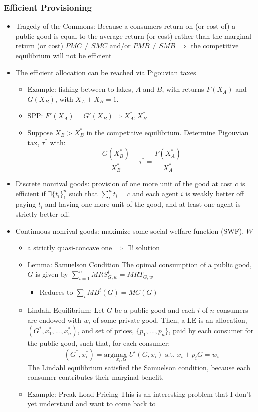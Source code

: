 \documentclass{article}
\newcommand{\usmax}[1]{\underset{#1}{\text{max }}}
\newcommand{\red}[1]{{\color{red}#1}}
\newcommand{\blue}[1]{{\color{blue}#1}}
\begin{document}
\subsubsection{Efficient Provisioning}
\begin{itemize}
	\item \blue{Tragedy of the Commons:} Because a consumers return on (or cost of) a public good is equal to the average return (or cost) rather than the marginal return (or cost) $PMC\neq SMC$ and/or $PMB\neq SMB$ $\Rightarrow$ the competitive equilibrium will not be efficient
	\item The efficient allocation can be reached via Pigouvian taxes
		\begin{itemize}
			\item Example: fishing between to lakes, $A$ and $B$, with returns $F(X_A)$ and $G(X_B)$, with $X_A+X_B=1$.
			\item SPP: $F'(X_A)=G'(X_B)\Rightarrow X_A^*,X_B^*$
			\item Suppose $X_B>X_B^*$ in the competitive equilibrium. Determine Pigouvian tax, $\tau^*$ with:
				\[
					\frac{G(X^*_B)}{X_B^*}-\tau^* = \frac{F(X^*_A)}{X_A^*}
				\]
		\end{itemize}
	\item Discrete nonrival goods: provision of one more unit of the good at cost $c$ is efficient if $\exists\{t_i\}_1^n$ such that $\sum_i^nt_i=c$ and each agent $i$ is weakly better off paying $t_i$ and having one more unit of the good, and at least one agent is strictly better off.
	\item Continuous nonrival goods: maximize some social welfare function (SWF), $W$ 
		\begin{itemize}
			\item a strictly quasi-concave one $\Rightarrow$ $\exists!$ solution
			\item \blue{Lemma: Samuelson Condition} The opimal consumption of a public good, $G$ is given by $\sum_{i=1}^nMRS^i_{G,w}=MRT_{G,w}$
				\begin{itemize}
					\item Reduces to $\sum_iMB^i(G)=MC(G)$
				\end{itemize}
			\item \blue{Lindahl Equilibrium:} Let $G$ be a public good and each $i$ of $n$ consumers are endowed with $w_i$ of some private good. Then, a LE is an allocation, ${(G^*,x_1^*,...,x_n^*)}$, and set of prices, $\{p_1,...,p_n\}$, paid by each consumer for the public good, such that, for each consumer:
				\[
					(G^*,x_i^*) = \text{arg}\usmax{x_i,G}U^i(G,x_i)\text{ s.t. }x_i + p_iG = w_i
				\]
				The Lindahl equilibrium satisfied the Samuelson condition, because each consumer contributes their marginal benefit.
			\item \red{Example: Preak Load Pricing} This is an interesting problem that I don't yet understand and want to come back to
		\end{itemize}
\end{itemize}
\end{document}
